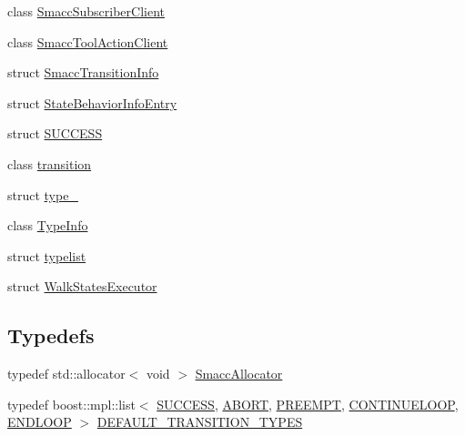 \begin{DoxyCompactItemize}
\item 
class \hyperlink{classsmacc_1_1SmaccSubscriberClient}{Smacc\+Subscriber\+Client}
\item 
class \hyperlink{classsmacc_1_1SmaccToolActionClient}{Smacc\+Tool\+Action\+Client}
\item 
struct \hyperlink{structsmacc_1_1SmaccTransitionInfo}{Smacc\+Transition\+Info}
\item 
struct \hyperlink{structsmacc_1_1StateBehaviorInfoEntry}{State\+Behavior\+Info\+Entry}
\item 
struct \hyperlink{structsmacc_1_1SUCCESS}{S\+U\+C\+C\+E\+SS}
\item 
class \hyperlink{classsmacc_1_1transition}{transition}
\item 
struct \hyperlink{structsmacc_1_1type__}{type\+\_\+}
\item 
class \hyperlink{classsmacc_1_1TypeInfo}{Type\+Info}
\item 
struct \hyperlink{structsmacc_1_1typelist}{typelist}
\item 
struct \hyperlink{structsmacc_1_1WalkStatesExecutor}{Walk\+States\+Executor}
\end{DoxyCompactItemize}
\subsection*{Typedefs}
\begin{DoxyCompactItemize}
\item 
typedef std\+::allocator$<$ void $>$ \hyperlink{namespacesmacc_ac43548af6721e408234339fcf1ab1254}{Smacc\+Allocator}
\item 
typedef boost\+::mpl\+::list$<$ \hyperlink{structsmacc_1_1SUCCESS}{S\+U\+C\+C\+E\+SS}, \hyperlink{structsmacc_1_1ABORT}{A\+B\+O\+RT}, \hyperlink{structsmacc_1_1PREEMPT}{P\+R\+E\+E\+M\+PT}, \hyperlink{structsmacc_1_1CONTINUELOOP}{C\+O\+N\+T\+I\+N\+U\+E\+L\+O\+OP}, \hyperlink{structsmacc_1_1ENDLOOP}{E\+N\+D\+L\+O\+OP} $>$ \hyperlink{namespacesmacc_a5238572f5e2747391ba919540aaf70bd}{D\+E\+F\+A\+U\+L\+T\+\_\+\+T\+R\+A\+N\+S\+I\+T\+I\+O\+N\+\_\+\+T\+Y\+P\+ES}
\end{DoxyCompactItemize}
